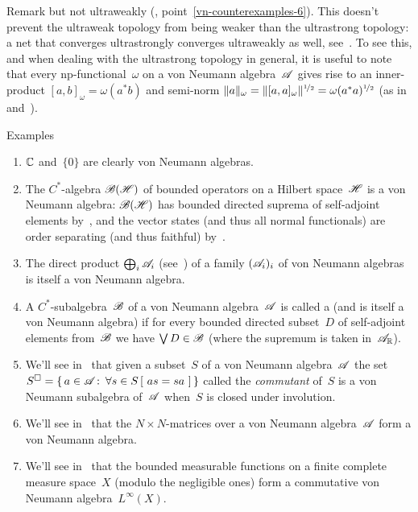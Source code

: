 \documentclass[a]{subfiles}
\begin{document}
\begin{parsec}[vna]
\begin{point}{Remark}
but not ultraweakly (, 
point~\ref{vn-counterexamples-6}).
This doesn't prevent 
the ultraweak topology 
from being weaker than the ultrastrong topology:
a net that converges ultrastrongly converges ultraweakly as well,
see~.
To see this,
and when dealing with the 
ultrastrong topology in general,
it is useful to note that
every np-functional~$\omega$
on a von Neumann algebra~$\mathscr{A}$ gives rise
to an inner-product $[a,b]_\omega = \omega(a^*b)$
and semi-norm $\|a\|_\omega = \|[a,a]_\omega\|^{\nicefrac{1}{2}}
= \omega(a^*a)^{\nicefrac{1}{2}}$
(as in~ and~).
\end{point}
\begin{point}{Examples}%
\begin{enumerate}
\item
$\mathbb{C}$ and~$\{0\}$ are clearly von Neumann algebras.
\item
The $C^*$-algebra $\mathscr{B}(\mathscr{H})$
of bounded operators on a Hilbert space~$\mathscr{H}$
is a von Neumann algebra:
$\mathscr{B}(\mathscr{H})$ has bounded directed suprema
of self-adjoint elements
by~,
and the vector states
(and thus all normal functionals)
are order separating
(and thus faithful)
by~.
\item
The direct product $\bigoplus_i \mathscr{A}_i$
(see~)
of a family $(\mathscr{A}_i)_i$
of von Neumann algebras
is itself a von Neumann algebra.
\item
A $C^*$-subalgebra~$\mathscr{B}$
of a von Neumann algebra~$\mathscr{A}$
is called a 
(and is itself a von Neumann algebra)
if for every bounded directed subset~$D$
of self-adjoint elements from~$\mathscr{B}$
we have $\bigvee D\in\mathscr{B}$
(where the supremum is taken in~$\mathscr{A}_{\mathbb{R}}$).
\item
We'll see in~
that given a subset~$S$ of a von Neumann algebra~$\mathscr{A}$
the set~$S^\square = \{\,a\in\mathscr{A}\colon\, \forall s\in S\,[\ as=sa\ ]\,\}$
called the \emph{commutant} of~$S$
is a von Neumann subalgebra of~$\mathscr{A}$
when~$S$ is closed under involution.
\item
We'll see in~
that the $N\times N$-matrices over a von Neumann algebra~$\mathscr{A}$
form a von Neumann algebra.
\item
We'll see in~
that the bounded measurable functions
on a finite complete measure space~$X$ 
(modulo the negligible ones)
form
a commutative von Neumann algebra~$L^\infty(X)$.
\end{enumerate}
\end{point}
\end{parsec}
\end{document}
